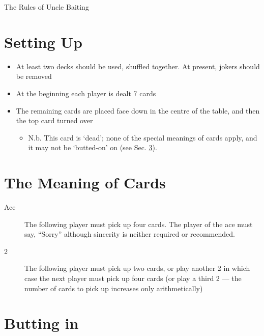 \documentclass[12pt]{article}
\newcommand{\Sec}[1]{Sec. \ref{#1}}
\begin{document}
\begin{center}
  \large The Rules of Uncle Baiting
\end{center}



\section{Setting Up}

\begin{itemize}
\item At least two decks should be used, shuffled together.  At present, jokers should be removed
  
\item At the beginning each player is dealt 7 cards
  
\item The remaining cards are placed face down in the centre of the table, and then the
  top card turned over

  \begin{itemize}
    \item N.b. This card is `dead'; none of the special meanings of cards apply, and it
      may not be `butted-on' on (see \Sec{buttingIn}).
  \end{itemize}
\end{itemize}

\section{The Meaning of Cards}

\begin{description}
\item[Ace]
  The following player must pick up four cards.  The player of the ace must say, ``Sorry'' although sincerity is neither required or recommended.

  \item[2]
    The following player must pick up two cards, or play another 2 in which case the next player must
    pick up four cards (or play a third 2 --- the number of cards to pick up increases only arithmetically)

\end{description}

\section{Butting in}
\label{buttingIn}
\end{document}
